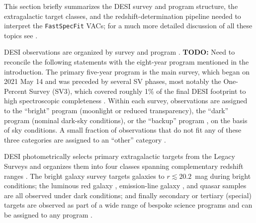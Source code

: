 \documentclass[modern,linenumbers]{aastex701}
\newcommand{\todo}[1]{{\color{red}\textbf{TODO:} #1}}
\newcommand{\fastspecfit}{\texttt{FastSpecFit}}
\begin{document}
This section briefly summarizes the DESI survey and program structure,
the extragalactic target classes, and the redshift-determination
pipeline needed to interpret the \fastspecfit{} VACs; for a much more
detailed discussion of all these topics see
\citet{desi-collaboration24e, desi-collaboration24d,
  desi-collaboration26a}.

DESI observations are organized by survey and program
\citep{schlafly23a, myers23a}. \todo{Need to reconcile the following
  statements with the eight-year program mentioned in the
  introduction.} The primary five-year program is the main survey,
which began on 2021 May 14 and was preceded by several SV phases, most
notably the One-Percent Survey (SV3), which covered roughly 1\% of the
final DESI footprint to high spectroscopic completeness
\citep{desi-collaboration24e, desi-collaboration24d}. Within each
survey, observations are assigned to the ``bright'' program (moonlight
or reduced transparency), the ``dark'' program (nominal dark-sky
conditions), or the ``backup'' program \citep[twilight and
  poor-weather time;][]{dey26a}, on the basis of sky conditions. A
small fraction of observations that do not fit any of these three
categories are assigned to an ``other'' category
\citep{desi-collaboration26a}.

DESI photometrically selects primary extragalactic targets from the
Legacy Surveys \citep{dey19a} and organizes them into four classes
spanning complementary redshift ranges \citep{myers23a}. The bright
galaxy survey \citep[BGS, $0 < z \lesssim 0.6$;][]{hahn23a} targets
galaxies to $r \lesssim 20.2$~mag during bright conditions; the
luminous red galaxy \citep[LRG, $0.4 < z \lesssim 1.1$;][]{zhou23a},
emission-line galaxy \citep[ELG, $0.6 < z \lesssim
  1.6$;][]{raichoor23a}, and quasar \citep[QSO, $0.9 < z \lesssim
  4$;][]{chaussidon23a} samples are all observed under dark
conditions; and finally secondary or tertiary (special) targets are
observed as part of a wide range of bespoke science programs and can
be assigned to any program \citep{myers23a, desi-collaboration26a}.
\end{document}
